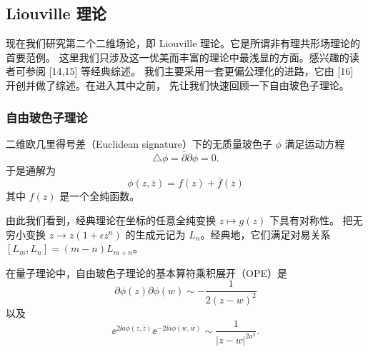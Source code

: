 %

\subsection{Liouville 理论}

现在我们研究第二个二维场论，即 Liouville 理论。它是所谓非有理共形场理论的首要范例。
这里我们只涉及这一优美而丰富的理论中最浅显的方面。感兴趣的读者可参阅 [14,15] 等经典综述。
我们主要采用一套更偏公理化的进路，它由 [16] 开创并做了综述。在进入其中之前，
先让我们快速回顾一下自由玻色子理论。

\subsubsection{自由玻色子理论}

二维欧几里得号差（Euclidean signature）下的无质量玻色子 $\phi$ 满足运动方程
\begin{equation}
  \triangle\phi = \bar\partial\partial\phi = 0.
  \tag{2.31}
\end{equation}
于是通解为
\begin{equation}
  \phi(z,\bar z) = f(z) + \bar f(\bar z)
  \tag{2.32}
\end{equation}
其中 $f(z)$ 是一个全纯函数。


由此我们看到，经典理论在坐标的任意全纯变换 $z\mapsto g(z)$ 下具有对称性。
把无穷小变换 $z\to z(1+\epsilon z^n)$ 的生成元记为 $L_n$。经典地，它们满足对易关系
$[L_m,L_n]=(m-n)L_{m+n}$。

在量子理论中，自由玻色子理论的基本算符乘积展开（OPE）是
\begin{equation}
  \partial\phi(z)\partial\phi(w) \sim -\frac{1}{2(z-w)^2}
  \tag{2.33}
\end{equation}
以及
\begin{equation}
  \ee^{2\ii a\phi(z,\bar z)}\ee^{-2\ii a\phi(w,\bar w)} \sim \frac{1}{|z-w|^{2a^2}}.
  \tag{2.34}
\end{equation}

